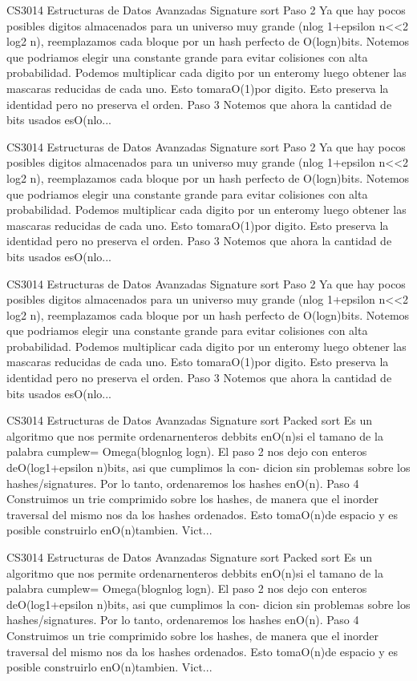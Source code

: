 \begin{description}[leftmargin=!,labelwidth=4.2em,style=nextline]
\item[Pag. 26] CS3014 Estructuras de Datos Avanzadas Signature sort Paso 2 Ya que hay pocos posibles digitos almacenados para un universo muy grande (nlog 1+epsilon n<<2 log2 n), reemplazamos cada bloque por un hash perfecto de O(logn)bits. Notemos que podriamos elegir una constante grande para evitar colisiones con alta probabilidad. Podemos multiplicar cada digito por un enteromy luego obtener las mascaras reducidas de cada uno. Esto tomaraO(1)por digito. Esto preserva la identidad pero no preserva el orden. Paso 3 Notemos que ahora la cantidad de bits usados esO(nlo...
\item[Pag. 27] CS3014 Estructuras de Datos Avanzadas Signature sort Paso 2 Ya que hay pocos posibles digitos almacenados para un universo muy grande (nlog 1+epsilon n<<2 log2 n), reemplazamos cada bloque por un hash perfecto de O(logn)bits. Notemos que podriamos elegir una constante grande para evitar colisiones con alta probabilidad. Podemos multiplicar cada digito por un enteromy luego obtener las mascaras reducidas de cada uno. Esto tomaraO(1)por digito. Esto preserva la identidad pero no preserva el orden. Paso 3 Notemos que ahora la cantidad de bits usados esO(nlo...
\item[Pag. 28] CS3014 Estructuras de Datos Avanzadas Signature sort Paso 2 Ya que hay pocos posibles digitos almacenados para un universo muy grande (nlog 1+epsilon n<<2 log2 n), reemplazamos cada bloque por un hash perfecto de O(logn)bits. Notemos que podriamos elegir una constante grande para evitar colisiones con alta probabilidad. Podemos multiplicar cada digito por un enteromy luego obtener las mascaras reducidas de cada uno. Esto tomaraO(1)por digito. Esto preserva la identidad pero no preserva el orden. Paso 3 Notemos que ahora la cantidad de bits usados esO(nlo...
\item[Pag. 29] CS3014 Estructuras de Datos Avanzadas Signature sort Packed sort Es un algoritmo que nos permite ordenarnenteros debbits enO(n)si el tamano de la palabra cumplew= Omega(blognlog logn). El paso 2 nos dejo con enteros deO(log1+epsilon n)bits, asi que cumplimos la con- dicion sin problemas sobre los hashes/signatures. Por lo tanto, ordenaremos los hashes enO(n). Paso 4 Construimos un trie comprimido sobre los hashes, de manera que el inorder traversal del mismo nos da los hashes ordenados. Esto tomaO(n)de espacio y es posible construirlo enO(n)tambien. Vict...
\item[Pag. 30] CS3014 Estructuras de Datos Avanzadas Signature sort Packed sort Es un algoritmo que nos permite ordenarnenteros debbits enO(n)si el tamano de la palabra cumplew= Omega(blognlog logn). El paso 2 nos dejo con enteros deO(log1+epsilon n)bits, asi que cumplimos la con- dicion sin problemas sobre los hashes/signatures. Por lo tanto, ordenaremos los hashes enO(n). Paso 4 Construimos un trie comprimido sobre los hashes, de manera que el inorder traversal del mismo nos da los hashes ordenados. Esto tomaO(n)de espacio y es posible construirlo enO(n)tambien. Vict...

\end{description}
